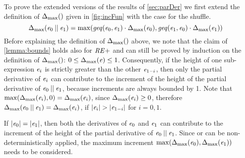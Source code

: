 To prove the extended versions of the results of \cref{sec:parDer} we first extend the definition of ${\Delta_{\max}}({})$ given in \cref{fig:incFun} with the case for the shuffle.
\[
 {\Delta_{\max}}({\mathit {e}_0\mathbin{||}\mathit {e}_1})=\max(\mathit{geq}({\mathit {e}_0},{\mathit {e}_1})\cdot{\Delta_{\max}}({\mathit {e}_0}),\mathit{geq}({\mathit {e}_1},{\mathit {e}_0})\cdot{\Delta_{\max}}({\mathit {e}_1}))
\]
Before explaining the definition of ${\Delta_{\max}}({})$ above, we note that the claim of \cref{lemma:bounds} holds also for $\mathit {RE+}$ and can still be proved by induction on the definition of ${\Delta_{\max}}({})$: $0\leq{\Delta_{\max}}({\mathit {e}})\leq 1$.
Consequently, if the height of one sub-expression $\mathit {e}_i$ is strictly greater than the other $\mathit {e}_{1-i}$, then only the partial derivative of $\mathit {e}_i$ can contribute to the increment of the height of the partial derivative of $\mathit {e}_0\mathbin{||}\mathit {e}_1$, because increments are always bounded by 1.
Note that $\max({\Delta_{\max}}({\mathit {e}_i}),0)={\Delta_{\max}}({\mathit {e}_i})$, since ${\Delta_{\max}}({\mathit {e}_i})\geq 0$, therefore ${\Delta_{\max}}({\mathit {e}_0\mathbin{||}\mathit {e}_1})={\Delta_{\max}}({\mathit {e}_i})$, if ${\mid}{\mathit {e}_i}{\mid}>{\mid}{\mathit {e}_{1-i}}{\mid}$ for $i=0,1$.

If ${\mid}{\mathit {e}_0}{\mid}={\mid}{\mathit {e}_1}{\mid}$, then both the derivatives of $\mathit {e}_0$ and $\mathit {e}_1$ can contribute to the increment of the height of the partial derivative of $\mathit {e}_0\mathbin{||}\mathit {e}_1$.
Since  or  can be non-deterministically applied, the maximum increment
$\max({\Delta_{\max}}({\mathit {e}_0}),{\Delta_{\max}}({\mathit {e}_1}))$ needs to be considered.